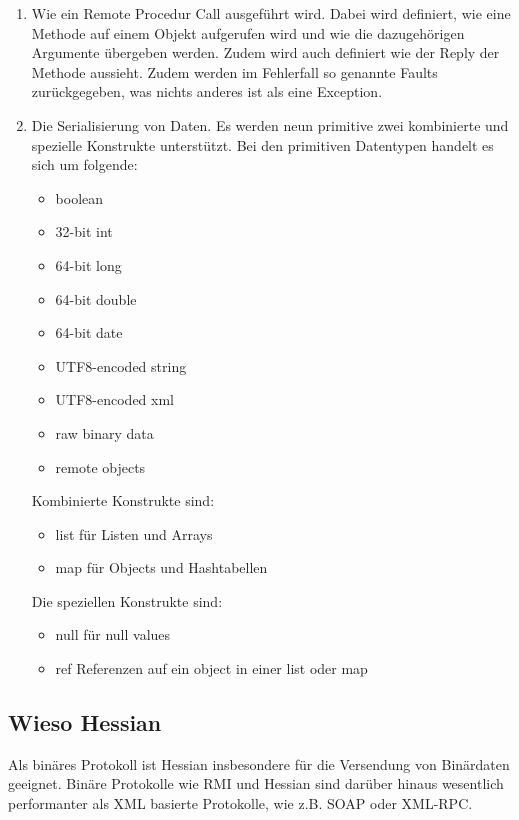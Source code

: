 \documentclass[abstracton, listof=totocnumbered,
bibliography=totocnumbered]{scrreprt}
\begin{document}
  \begin{enumerate}
    \item Wie ein Remote Procedur Call ausgeführt wird. Dabei wird
    definiert, wie eine Methode auf einem Objekt aufgerufen wird und wie die
    dazugehörigen Argumente übergeben werden. Zudem wird auch definiert wie der
    Reply der Methode aussieht. Zudem werden im Fehlerfall so genannte Faults
    zurückgegeben, was nichts anderes ist als eine Exception.
    \item Die Serialisierung von Daten. Es werden neun primitive zwei
    kombinierte und spezielle Konstrukte unterstützt. Bei den primitiven
    Datentypen handelt es sich um folgende:
    \begin{itemize}
      \item boolean
      \item 32-bit int
      \item 64-bit long
      \item 64-bit double
      \item 64-bit date
      \item UTF8-encoded string
      \item UTF8-encoded xml
      \item raw binary data
      \item remote objects
    \end{itemize}
    Kombinierte Konstrukte sind:
    \begin{itemize}
      \item list für Listen und Arrays
      \item map für Objects und Hashtabellen
    \end{itemize}
    Die speziellen Konstrukte sind:
    \begin{itemize}
      \item null für null values
      \item ref Referenzen auf ein object in einer list oder map
    \end{itemize}
  \end{enumerate}
  
  \subsection{Wieso Hessian}
  
  Als binäres Protokoll ist Hessian insbesondere für die Versendung von
  Binärdaten geeignet. Binäre Protokolle wie RMI und Hessian sind darüber
  hinaus wesentlich performanter als XML basierte Protokolle, wie z.B. \ac{SOAP}
  oder XML-RPC.
\end{document}
